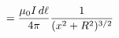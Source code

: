 \documentclass[preview]{standalone}
\begin{document}
\begin{align*}
= {\mu_0 I \, d\ell \over 4\pi} {1 \over (x^2 + R^2)^{3/2}}
\end{align*}
\end{document}
